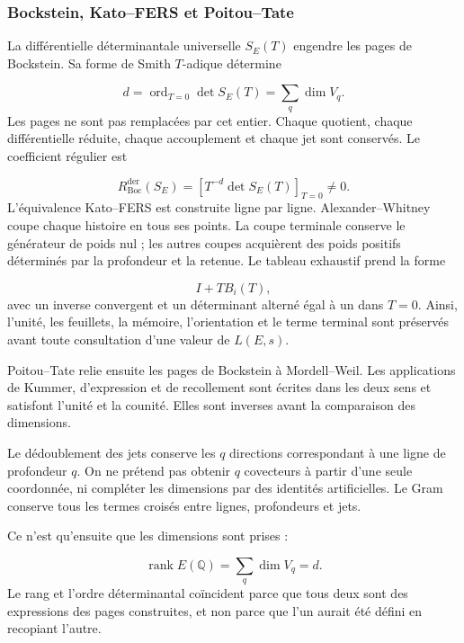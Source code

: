 \subsubsection{Bockstein, Kato–FERS et Poitou–Tate}
La différentielle déterminantale universelle \(S_E(T)\) engendre les pages de Bockstein. Sa forme de Smith \(T\)-adique détermine\par
\[
d
=
\operatorname{ord}_{T=0}
\det S_E(T)
=
\sum_q \dim V_q.
\]
Les pages ne sont pas remplacées par cet entier. Chaque quotient, chaque différentielle réduite, chaque accouplement et chaque jet sont conservés. Le coefficient régulier est\par
\[
R_{\mathrm{Boc}}^{\mathrm{der}}(S_E)
=
\left[
T^{-d}\det S_E(T)
\right]_{T=0}
\neq0.
\]
L’équivalence Kato–FERS est construite ligne par ligne. Alexander–Whitney coupe chaque histoire en tous ses points. La coupe terminale conserve le générateur de poids nul ; les autres coupes acquièrent des poids positifs déterminés par la profondeur et la retenue. Le tableau exhaustif prend la forme\par
\[
I+TB_i(T),
\]
avec un inverse convergent et un déterminant alterné égal à un dans \(T=0\). Ainsi, l’unité, les feuillets, la mémoire, l’orientation et le terme terminal sont préservés avant toute consultation d’une valeur de \(L(E,s)\).\par
Poitou–Tate relie ensuite les pages de Bockstein à Mordell–Weil. Les applications de Kummer, d’expression et de recollement sont écrites dans les deux sens et satisfont l’unité et la counité. Elles sont inverses avant la comparaison des dimensions.\par
Le dédoublement des jets conserve les \(q\) directions correspondant à une ligne de profondeur \(q\). On ne prétend pas obtenir \(q\) covecteurs à partir d’une seule coordonnée, ni compléter les dimensions par des identités artificielles. Le Gram conserve tous les termes croisés entre lignes, profondeurs et jets.\par
Ce n’est qu’ensuite que les dimensions sont prises :\par
\[
\operatorname{rank}E(\mathbb Q)
=
\sum_q\dim V_q
=
d.
\]
Le rang et l’ordre déterminantal coïncident parce que tous deux sont des expressions des pages construites, et non parce que l’un aurait été défini en recopiant l’autre.\par
{}
